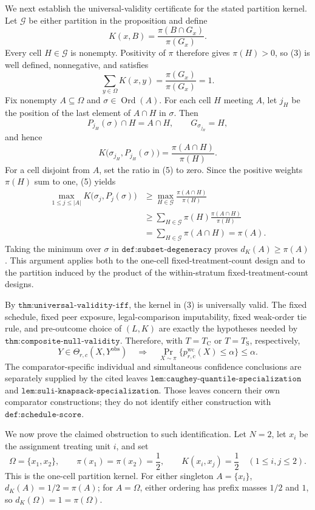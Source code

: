 We next establish the universal-validity certificate for the stated partition kernel.  Let \(\mathcal G\) be either partition in the proposition and define
\[
 K(x,B)=\frac{\pi(B\cap G_x)}{\pi(G_x)}.
\tag{3}
\]
Every cell \(H\in\mathcal G\) is nonempty.  Positivity of \(\pi\) therefore gives \(\pi(H)>0\), so (3) is well defined, nonnegative, and satisfies
\[
 \sum_{y\in\Omega}K(x,y)=\frac{\pi(G_x)}{\pi(G_x)}=1.
\tag{4}
\]
Fix nonempty \(A\subseteq\Omega\) and \(\sigma\in\operatorname{Ord}(A)\).  For each cell \(H\) meeting \(A\), let \(j_H\) be the position of the last element of \(A\cap H\) in \(\sigma\).  Then
\[
 P_{j_H}(\sigma)\cap H=A\cap H,
 \qquad G_{\sigma_{j_H}}=H,
\]
and hence
\[
 K\bigl(\sigma_{j_H},P_{j_H}(\sigma)\bigr)
 =\frac{\pi(A\cap H)}{\pi(H)}.
\tag{5}
\]
For a cell disjoint from \(A\), set the ratio in (5) to zero.  Since the positive weights \(\pi(H)\) sum to one, (5) yields
\[
 \begin{aligned}
 \max_{1\leq j\leq |A|}K\bigl(\sigma_j,P_j(\sigma)\bigr)
 &\geq \max_{H\in\mathcal G}\frac{\pi(A\cap H)}{\pi(H)}\\
 &\geq \sum_{H\in\mathcal G}\pi(H)
       \frac{\pi(A\cap H)}{\pi(H)}\\
 &=\sum_{H\in\mathcal G}\pi(A\cap H)
 =\pi(A).
 \end{aligned}
\tag{6}
\]
Taking the minimum over \(\sigma\) in \(\texttt{def:subset-degeneracy}\) proves \(d_K(A)\geq\pi(A)\).  This argument applies both to the one-cell fixed-treatment-count design and to the partition induced by the product of the within-stratum fixed-treatment-count designs.

By \(\texttt{thm:universal-validity-iff}\), the kernel in (3) is universally valid.  The fixed schedule, fixed peer exposure, legal-comparison imputability, fixed weak-order tie rule, and pre-outcome choice of \((L,K)\) are exactly the hypotheses needed by \(\texttt{thm:composite-null-validity}\).  Therefore, with \(T=T_{\mathrm C}\) or \(T=T_{\mathrm S}\), respectively,
\[
 Y\in\Theta_{r,c}(X,Y^{\mathrm{obs}})
 \quad\Longrightarrow\quad
 \Pr_{X\sim\pi}\{p^{\mathrm{wc}}_{r,c}(X)\leq\alpha\}
 \leq\alpha.
\tag{7}
\]
The comparator-specific individual and simultaneous confidence conclusions are separately supplied by the cited leaves \(\texttt{lem:caughey-quantile-specialization}\) and \(\texttt{lem:suli-knapsack-specialization}\).  Those leaves concern their own comparator constructions; they do not identify either construction with \(\texttt{def:schedule-score}\).

We now prove the claimed obstruction to such identification.  Let \(N=2\), let \(x_i\) be the assignment treating unit \(i\), and set
\[
 \Omega=\{x_1,x_2\},\qquad
 \pi(x_1)=\pi(x_2)=\frac12,
 \qquad K(x_i,x_j)=\frac12\quad(1\leq i,j\leq2).
\tag{8}
\]
This is the one-cell partition kernel.  For either singleton \(A=\{x_i\}\), \(d_K(A)=1/2=\pi(A)\); for \(A=\Omega\), either ordering has prefix masses \(1/2\) and \(1\), so \(d_K(\Omega)=1=\pi(\Omega)\).

